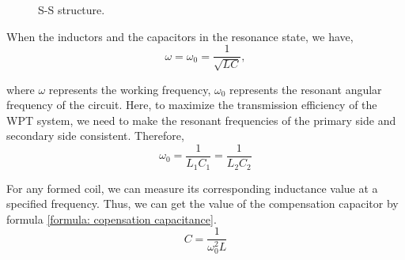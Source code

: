 \begin{figure}[!t]
    \centering
    \caption{S-S structure.}
    \label{fig:ss topology}
\end{figure}

When the inductors and the capacitors in the resonance state, we have,
\begin{equation}
    \omega=\omega _0=\frac{1}{\sqrt{LC}},
    \label{formula:resonant frequency}
\end{equation}

where $\omega$ represents the working frequency, $\omega _0$ represents the resonant angular frequency of the circuit. Here, to maximize the transmission efficiency of the WPT system, we need to make the resonant frequencies of the primary side and secondary side consistent. Therefore,
\begin{equation}
    \omega _0 = \frac{1}{L_1C_1} = \frac{1}{L_2C_2}
\end{equation}

For any formed coil, we can measure its corresponding inductance value at a specified frequency. Thus, we can get the value of the compensation capacitor by formula \ref{formula: copensation capacitance}.
\begin{equation}
    C = \frac{1}{\omega_0^2 L}
    \label{formula: copensation capacitance}
\end{equation}

